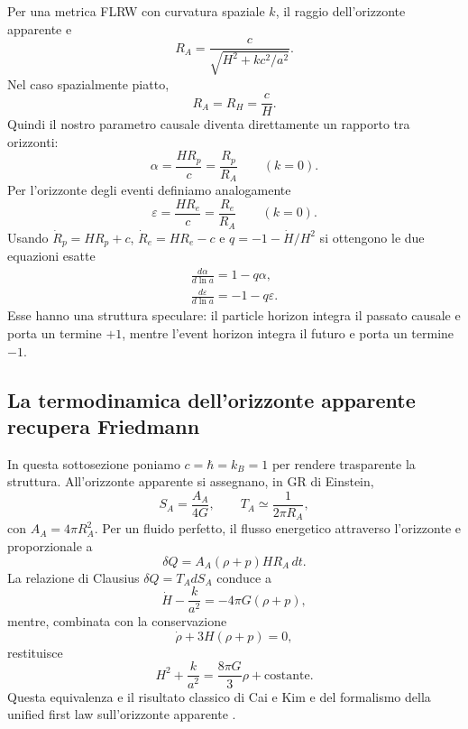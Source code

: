 \documentclass[11pt,a4paper]{article}
\begin{document}
Per una metrica FLRW con curvatura spaziale $k$, il raggio dell'orizzonte apparente e
\begin{equation}
 R_A=\frac{c}{\sqrt{H^2+kc^2/a^2}}.
 \label{eq:apparent_horizon}
\end{equation}
Nel caso spazialmente piatto,
\begin{equation}
 \boxed{R_A=R_H=\frac{c}{H}.}
\end{equation}
Quindi il nostro parametro causale diventa direttamente un rapporto tra orizzonti:
\begin{equation}
 \boxed{\alpha=\frac{HR_p}{c}=\frac{R_p}{R_A}}\qquad(k=0).
 \label{eq:alpha_ratio}
\end{equation}
Per l'orizzonte degli eventi definiamo analogamente
\begin{equation}
 \boxed{\varepsilon=\frac{HR_e}{c}=\frac{R_e}{R_A}}\qquad(k=0).
 \label{eq:epsilon_def}
\end{equation}
Usando $\dot R_p=HR_p+c$, $\dot R_e=HR_e-c$ e $q=-1-\dot H/H^2$ si ottengono le due equazioni esatte
\begin{align}
 \boxed{\frac{d\alpha}{d\ln a}=1-q\alpha},\label{eq:alpha_evol_r8}\\
 \boxed{\frac{d\varepsilon}{d\ln a}=-1-q\varepsilon}.\label{eq:epsilon_evol_r8}
\end{align}
Esse hanno una struttura speculare: il particle horizon integra il passato causale e porta un termine $+1$, mentre l'event horizon integra il futuro e porta un termine $-1$.

\subsection{La termodinamica dell'orizzonte apparente recupera Friedmann}

In questa sottosezione poniamo $c=\hbar=k_B=1$ per rendere trasparente la struttura. All'orizzonte apparente si assegnano, in GR di Einstein,
\begin{equation}
 S_A=\frac{A_A}{4G},\qquad T_A\simeq\frac{1}{2\pi R_A},
\end{equation}
con $A_A=4\pi R_A^2$. Per un fluido perfetto, il flusso energetico attraverso l'orizzonte e proporzionale a
\begin{equation}
 \delta Q=A_A(\rho+p)HR_A\,dt.
\end{equation}
La relazione di Clausius $\delta Q=T_A dS_A$ conduce a
\begin{equation}
 \boxed{\dot H-\frac{k}{a^2}=-4\pi G(\rho+p)},
 \label{eq:thermo_raychaudhuri}
\end{equation}
mentre, combinata con la conservazione
\begin{equation}
 \dot\rho+3H(\rho+p)=0,
\end{equation}
restituisce
\begin{equation}
 \boxed{H^2+\frac{k}{a^2}=\frac{8\pi G}{3}\rho+\mathrm{costante}.}
 \label{eq:thermo_friedmann}
\end{equation}
Questa equivalenza e il risultato classico di Cai e Kim e del formalismo della unified first law sull'orizzonte apparente \cite{CaiKim2005,CaiCao2007}.
\end{document}
